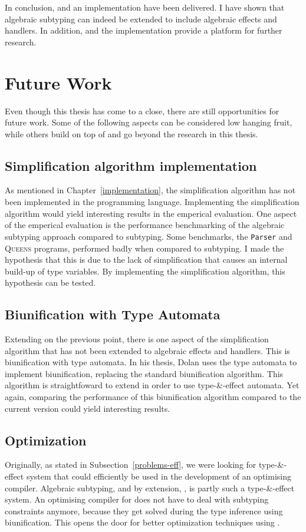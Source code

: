 In conclusion, \core and an implementation have been delivered. I have shown that algebraic subtyping can indeed be extended to include algebraic effects and handlers. In addition, \core and the implementation provide a platform for further research. 

\section{Future Work}
Even though this thesis has come to a close, there are still opportunities for future work. Some of the following aspects can be considered low hanging fruit, while others build on top of and go beyond the research in this thesis.

\subsection{Simplification algorithm implementation}
As mentioned in Chapter~\ref{implementation}, the simplification algorithm has not been implemented in the \eff programming language. Implementing the simplification algorithm would yield interesting results in the emperical evaluation. One aspect of the emperical evaluation is the performance benchmarking of the algebraic subtyping approach compared to subtyping. Some benchmarks, the \texttt{Parser} and \textsc{Queens} programs, performed badly when compared to subtyping. I made the hypothesis that this is due to the lack of simplification that causes an internal build-up of type variables. By implementing the simplification algorithm, this hypothesis can be tested. 

\subsection{Biunification with Type Automata}
Extending on the previous point, there is one aspect of the simplification algorithm that has not been extended to algebraic effects and handlers. This is biunification with type automata. In his thesis, Dolan uses the type automata to implement biunification, replacing the standard biunification algorithm. This algorithm is straightfoward to extend in order to use type-\&-effect automata. Yet again, comparing the performance of this biunification algorithm compared to the current version could yield interesting results.

\subsection{Optimization}
Originally, as stated in Subsection~\ref{problems-eff}, we were looking for type-\&-effect system that could efficiently be used in the development of an optimising compiler. Algebraic subtyping, and by extension, \core, is partly such a type-\&-effect system. An optimising compiler for \core does not have to deal with subtyping constraints anymore, because they get solved during the type inference using biunification. This opens the door for better optimization techniques using \core. 

